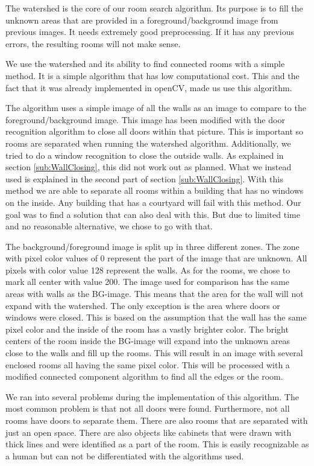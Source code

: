 The watershed is the core of our room search algorithm. Its purpose is to fill  the unknown areas that are provided in a foreground/background image from previous images. It needs extremely good preprocessing. If it has any previous errors, the resulting rooms will not make sense.

We use the watershed and its ability to find connected rooms with a simple method. It is a simple algorithm that has low computational cost. This and the fact that it was already implemented in openCV, made us use this algorithm.

The algorithm uses a simple image of all the walls as an image to compare to the foreground/background image. This image has been modified with the door recognition algorithm to close all doors within that picture. This is important so rooms are separated when running the watershed algorithm. Additionally, we tried to do a window recognition to close the outside walls. As explained in section \ref{sub:WallClosing}, this did not work out as planned. What we instead used is explained in the second part of section \ref{sub:WallClosing}. With this method we are able to separate all rooms within a building that has no windows on the inside. Any building that has a courtyard will fail with this method. Our goal was to find a solution that can also deal with this. But due to limited time and no reasonable alternative, we chose to go with that.

The background/foreground image is split up in three different zones. The zone with pixel color values of 0 represent the part of the image that are unknown. All pixels with color value 128 represent the walls. As for the rooms, we chose to mark all center with value 200. The image used for comparison has the same areas with walls as the BG-image. This means that the area for the wall will not expand with the watershed. The only exception is the area where doors or windows were closed. This is based on the assumption that the wall has the same pixel color and the inside of the room has a vastly brighter color.
The bright centers of the room inside the BG-image will expand into the unknown areas close to the walls and fill up the rooms. This will result in an image with several enclosed rooms all having the same pixel color. This will be processed with a modified connected component algorithm to find all the edges or the room.

We ran into several problems during the implementation of this algorithm. The most common problem is that not all doors were found. Furthermore, not all rooms have doors to separate them. There are also rooms that are separated with just an open space. There are also objects like cabinets that were drawn with thick lines and were identified as a part of the room. This is easily recognizable as a human but can not be differentiated with the algorithms used.

